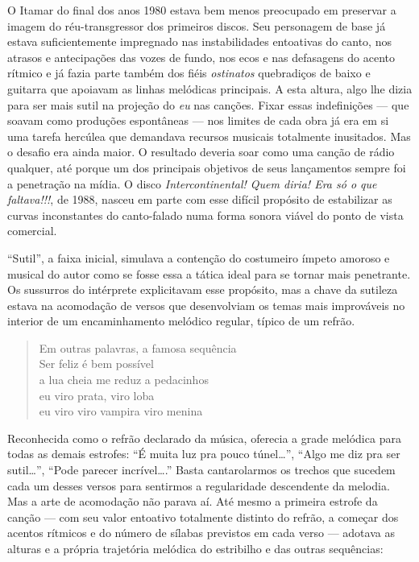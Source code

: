 O Itamar do final dos anos 1980 estava bem menos preocupado em preservar
a imagem do réu-transgressor dos primeiros discos. Seu personagem de
base já estava suficientemente impregnado nas instabilidades entoativas
do canto, nos atrasos e antecipações das vozes de fundo, nos ecos e nas
defasagens do acento rítmico e já fazia parte também dos fiéis \textit{ostinatos}
quebradiços de baixo e guitarra que apoiavam as linhas melódicas
principais. A esta altura, algo lhe dizia para ser mais sutil na
projeção do \textit{eu} nas canções. Fixar essas indefinições --- que soavam
como produções espontâneas --- nos limites de cada obra já era em si uma
tarefa hercúlea que demandava recursos musicais totalmente inusitados.
Mas o desafio era ainda maior. O resultado deveria soar como uma canção
de rádio qualquer, até porque um dos principais objetivos de seus
lançamentos sempre foi a penetração na mídia. O disco \textit{Intercontinental!
Quem diria! Era só o que faltava!!!}, de 1988, nasceu em parte com esse
difícil propósito de estabilizar as curvas inconstantes do canto-falado
numa forma sonora viável do ponto de vista comercial.

``Sutil'', a faixa inicial, simulava a contenção do costumeiro ímpeto
amoroso e musical do autor como se fosse essa a tática ideal para se
tornar mais penetrante. Os sussurros do intérprete explicitavam esse
propósito, mas a chave da sutileza estava na acomodação de versos que
desenvolviam os temas mais improváveis no interior de um encaminhamento
melódico regular, típico de um refrão.

\begin{verse}
\small{Em outras palavras, a famosa sequência\\
Ser feliz é bem possível\\
a lua cheia me reduz a pedacinhos\\
eu viro prata, viro loba\\
eu viro viro vampira viro menina}
\end{verse}

Reconhecida como o refrão declarado da música, oferecia a grade
melódica para todas as demais estrofes: ``É muita luz pra pouco
túnel\ldots'', ``Algo me diz pra ser sutil\ldots'', ``Pode parecer
incrível\ldots.'' Basta cantarolarmos os trechos que sucedem cada um desses
versos para sentirmos a regularidade descendente da melodia. Mas a arte
de acomodação não parava aí. Até mesmo a primeira estrofe da canção ---
com seu valor entoativo totalmente distinto do refrão, a começar dos
acentos rítmicos e do número de sílabas previstos em cada verso ---
adotava as alturas e a própria trajetória melódica do estribilho e das
outras sequências:

